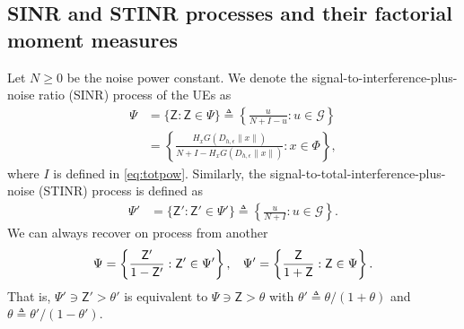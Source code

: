 \documentclass[lettersize,journal]{IEEEtran}
\begin{document}
\subsection{SINR and STINR processes and their factorial moment measures}
Let $N \geq 0$ be the noise power constant. We denote the signal-to-interference-plus-noise ratio (SINR) process of the UEs as
\begin{align}
  \label{eq:STIR}
  \Psi &= \{\mathsf{Z}: \mathsf{Z} \in \Psi\} \triangleq \left\{ \frac{u}{N+I-u} : u \in \mathcal{G}\right\} \\
  &=\left\{ \frac{H_x G(D_{h,\epsilon}\|x\|)}{N+I-H_x G(D_{h,\epsilon}\|x\|)} : x \in \Phi\right\},
\end{align}
where $I$ is defined in \eqref{eq:totpow}. Similarly, the signal-to-total-interference-plus-noise (STINR) process is defined as
\begin{align}
  \label{eq:STINR}
  \Psi' &= \{\mathsf{Z}': \mathsf{Z}' \in \Psi'\} \triangleq \left\{ \frac{u}{N+I} : u \in \mathcal{G}\right\}.
\end{align}
We can always recover on process from another
\begin{equation}
  \Psi = \left\{ \frac{\mathsf{Z}'}{1- \mathsf{Z}'}: \mathsf{Z}' \in \Psi' \right\}, \hspace{0.3cm} \Psi' = \left\{ \frac{\mathsf{Z}}{1+ \mathsf{Z}}: \mathsf{Z} \in \Psi \right\}.
\end{equation}
That is, $\Psi' \ni \mathsf{Z}'> \theta'$ is equivalent to $\Psi \ni\mathsf{Z}> \theta$ with $\theta' \triangleq \theta/(1+\theta)$ and $\theta \triangleq \theta'/(1-\theta')$.
\end{document}

